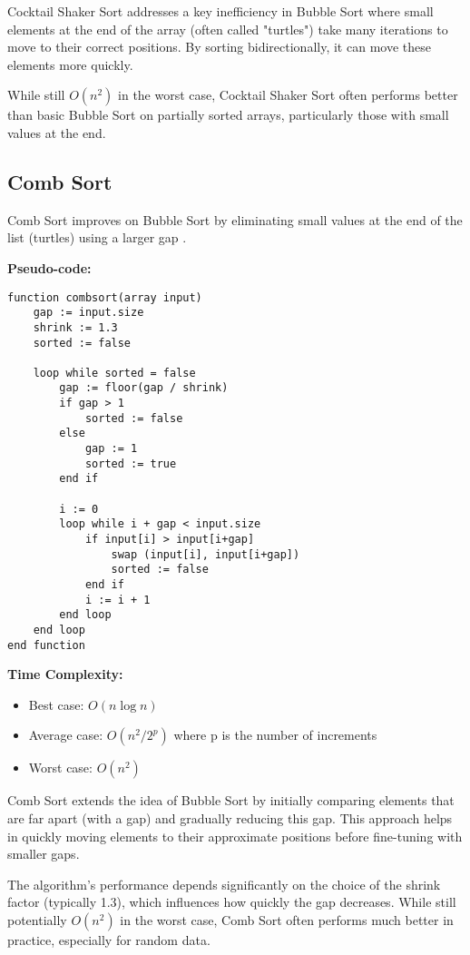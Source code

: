 \documentclass[sigconf]{acmart}
\begin{document}
Cocktail Shaker Sort addresses a key inefficiency in Bubble Sort where small elements at the end of the array (often called "turtles") take many iterations to move to their correct positions. By sorting bidirectionally, it can move these elements more quickly.

While still $O(n^2)$ in the worst case, Cocktail Shaker Sort often performs better than basic Bubble Sort on partially sorted arrays, particularly those with small values at the end.

\subsection{Comb Sort}
Comb Sort improves on Bubble Sort by eliminating small values at the end of the list (turtles) using a larger gap \cite{combsort, dobosiewicz1980efficient}.

\textbf{Pseudo-code:}
\begin{verbatim}
function combsort(array input)
    gap := input.size
    shrink := 1.3
    sorted := false
    
    loop while sorted = false
        gap := floor(gap / shrink)
        if gap > 1
            sorted := false
        else
            gap := 1
            sorted := true
        end if
        
        i := 0
        loop while i + gap < input.size
            if input[i] > input[i+gap]
                swap (input[i], input[i+gap])
                sorted := false
            end if
            i := i + 1
        end loop
    end loop
end function
\end{verbatim}

\textbf{Time Complexity:}
\begin{itemize}
    \item Best case: $O(n \log n)$
    \item Average case: $O(n^2/2^p)$ where p is the number of increments
    \item Worst case: $O(n^2)$
\end{itemize}

Comb Sort extends the idea of Bubble Sort by initially comparing elements that are far apart (with a gap) and gradually reducing this gap. This approach helps in quickly moving elements to their approximate positions before fine-tuning with smaller gaps.

The algorithm's performance depends significantly on the choice of the shrink factor (typically 1.3), which influences how quickly the gap decreases. While still potentially $O(n^2)$ in the worst case, Comb Sort often performs much better in practice, especially for random data.
\end{document}
